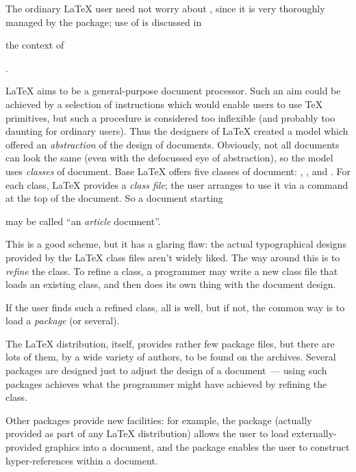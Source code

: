 The ordinary \LaTeX{} user need not worry about , since
it is very thoroughly managed by the  package; use of
 is discussed in
\begin{wideversion}
  the context of
\end{wideversion}
.


\LaTeX{} aims to be a general-purpose document processor.  Such an aim
could be achieved by a selection of instructions which would enable
users to use \TeX{} primitives, but such a procedure is considered too
inflexible (and probably too daunting for ordinary users).  Thus the
designers of \LaTeX{} created a model which offered an
\emph{abstraction} of the design of documents.  Obviously, not all
documents can look the same (even with the defocussed eye of
abstraction), so the model uses \emph{classes} of document.  Base
\LaTeX{} offers five classes of document: ,
,  and .
For each class, \LaTeX{} provides a \emph{class file}; the user
arranges to use it via a  command at the top of the
document.  So a document starting
\begin{quote}
\end{quote}
may be called ``an \emph{article} document''.

This is a good scheme, but it has a glaring flaw: the actual
typographical designs provided by the \LaTeX{} class files aren't
widely liked.  The way around this is to \emph{refine} the class.  To
refine a class, a programmer may write a new class file that loads an
existing class, and then does its own thing with the document design.

If the user finds such a refined class, all is well, but if not, the
common way is to load a \emph{package} (or several).

The \LaTeX{} distribution, itself, provides rather few package files,
but there are lots of them, by a wide variety of authors, to be found
on the archives.  Several packages are designed just to adjust the
design of a document~--- using such packages achieves what the
programmer might have achieved by refining the class.

Other packages provide new facilities: for example, the
 package (actually provided as part of any \LaTeX{}
distribution) allows the user to load externally-provided graphics
into a document, and the  package enables the user
to construct hyper-references within a document.

